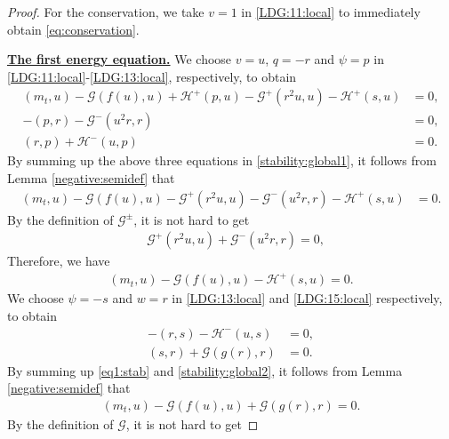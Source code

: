 \documentclass[11pt]{article}
\newcommand{\Hcal} {\mathcal{H}}
\newcommand{\Gcal} {\mathcal{G}}
\newcommand{\sumn}{\sum_{j=1}^N}
\numberwithin{equation}{section}
\newcommand{\jr}{j+\frac 12}
\begin{document}
\begin{proof}
For the conservation, we take $v=1$ in \eqref{LDG:11:local} to immediately obtain \eqref{eq:conservation}.

\noindent \underline{\textbf{The first energy equation.}} We choose $v=u$, $q=-r$ and $\psi=p$ in \eqref{LDG:11:local}-\eqref{LDG:13:local}, respectively, to obtain
\begin{subequations}\label{stability:global1}
		\begin{align}
			(m_{t}, u)-\Gcal(f(u), u)+\Hcal^+(p,u)-\Gcal^+(r^2u,u)-\Hcal^+(s,u)&=\!0,\label{stability:11:local}			\\
			-(p, r)-\Gcal^-(u^2r, r)&=\!0,\label{stability:12:local}	\\
			(r, p)+\Hcal^-(u, p)&=\!0.\label{stability:13:local}
		\end{align}
	\end{subequations}
By summing up the above three equations in \eqref{stability:global1}, it follows from Lemma \ref{negative:semidef} that
	\begin{align*}
(m_{t}, u)-\Gcal(f(u), u)-\Gcal^+(r^2u,u)-\Gcal^-(u^2r, r)-\Hcal^+(s,u)&=0.
	\end{align*}
By the definition of $\Gcal^{\pm}$, it is not hard to get
\begin{align}
&\Gcal^+(r^2u,u)+\Gcal^-(u^2r, r)=0,\label{eq:nonstability}
\end{align}
Therefore, we have
\begin{align}
(m_{t}, u)-\Gcal(f(u), u)-\Hcal^+(s,u)=0. \label{eq1:stab}
\end{align}
We choose $\psi=-s$ and $w=r$ in \eqref{LDG:13:local} and \eqref{LDG:15:local} respectively, to obtain
\begin{subequations}\label{stability:global2}
		\begin{align}
			-(r, s)-\Hcal^-(u, s)&=\!0,\label{stability:21:local}	\\
			(s, r)+\Gcal(g(r), r)&=\!0.\label{stability:22:local}
		\end{align}
	\end{subequations}
By summing up \eqref{eq1:stab} and \eqref{stability:global2}, it follows from Lemma \ref{negative:semidef} that
\begin{align}
(m_{t}, u)-\Gcal(f(u), u)+\Gcal(g(r), r)=0. \label{eq2:stab}
\end{align}
By the definition of $\Gcal$, it is not hard to get

\end{proof}
\end{document}
